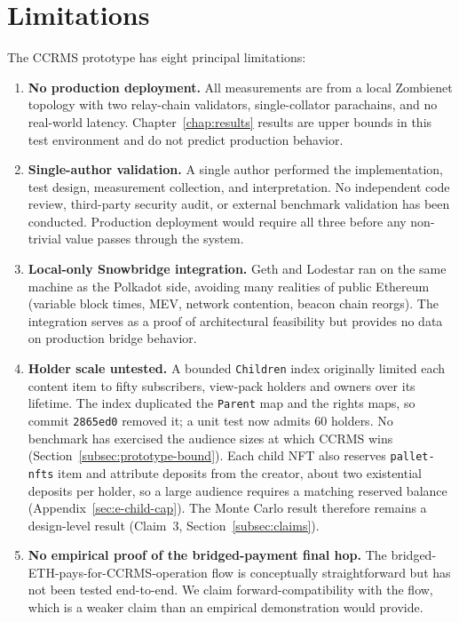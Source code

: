 \section{Limitations}\label{sec:limitations}

The CCRMS prototype has eight principal limitations:

\begin{enumerate}
\item \textbf{No production deployment.} All measurements are from a local Zombienet topology with two relay-chain validators, single-collator parachains, and no real-world latency. Chapter~\ref{chap:results} results are upper bounds in this test environment and do not predict production behavior.
\item \textbf{Single-author validation.} A single author performed the implementation, test design, measurement collection, and interpretation. No independent code review, third-party security audit, or external benchmark validation has been conducted. Production deployment would require all three before any non-trivial value passes through the system.
\item \textbf{Local-only Snowbridge integration.} Geth and Lodestar ran on the same machine as the Polkadot side, avoiding many realities of public Ethereum (variable block times, MEV, network contention, beacon chain reorgs). The integration serves as a proof of architectural feasibility but provides no data on production bridge behavior.
\item \textbf{Holder scale untested.} A bounded \texttt{Children} index originally limited each content item to fifty subscribers, view-pack holders and owners over its lifetime. The index duplicated the \texttt{Parent} map and the rights maps, so commit \texttt{2865ed0} removed it; a unit test now admits 60 holders. No benchmark has exercised the audience sizes at which CCRMS wins (Section~\ref{subsec:prototype-bound}). Each child NFT also reserves \texttt{pallet-nfts} item and attribute deposits from the creator, about two existential deposits per holder, so a large audience requires a matching reserved balance (Appendix~\ref{sec:e-child-cap}). The Monte Carlo result therefore remains a design-level result (Claim~3, Section~\ref{subsec:claims}).
\item \textbf{No empirical proof of the bridged-payment final hop.} The bridged-ETH-pays-for-CCRMS-operation flow is conceptually straightforward but has not been tested end-to-end. We claim forward-compatibility with the flow, which is a weaker claim than an empirical demonstration would provide.

\end{enumerate}
